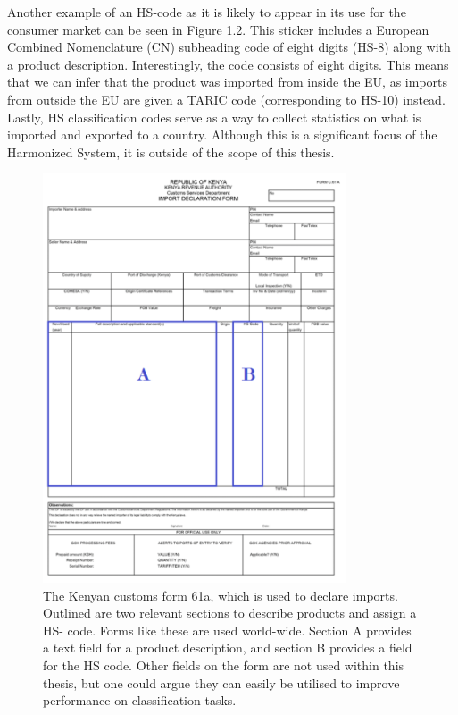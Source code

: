 Another example of an HS-code as it is likely to appear in its use for the consumer market can be seen in Figure 1.2. This sticker includes a European Combined Nomenclature (CN) subheading code of eight digits (HS-8) along with a product description. Interestingly, the code consists of eight digits. This means that we can infer that the product was imported from inside the EU, as imports from outside the EU are given a TARIC code (corresponding to HS-10) instead.\\

Lastly, HS classification codes serve as a way to collect statistics on what is imported and exported to a country. Although this is a significant focus of the Harmonized System, it is outside of the scope of this thesis.

\begin{figure}
    \centering
    \includegraphics[width=0.8\textwidth]{kenya.png}
    \caption{The Kenyan customs form 61a, which is used to declare imports. Outlined are two relevant sections to describe products and assign a HS- code. Forms like these are used world-wide. Section A provides a text field for a product description, and section B provides a field for the HS code. Other fields on the form are not used within this thesis, but one could argue they can easily be utilised to improve performance on classification tasks.}
    \label{fig:kenya}
\end{figure}


